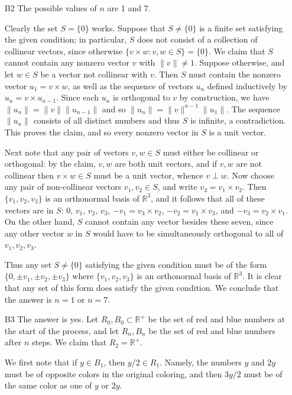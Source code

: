 \documentclass[amssymb,twocolumn,pra,10pt,aps]{revtex4-1}
\begin{document}
\begin{itemize}
\item[B2]
The possible values of $n$ are 1 and 7.

Clearly the set $S = \{0\}$ works. Suppose that $S \neq \{0\}$ is a finite set satisfying the given condition; in particular, $S$ does not consist of a collection of collinear vectors, since otherwise $\{v \times w: v,w \in S\} = \{0\}$. We claim that $S$ cannot contain any nonzero vector $v$ with $\|v\| \neq 1$. Suppose otherwise, and let $w \in S$ be a vector not collinear with $v$. Then $S$ must contain the nonzero vector $u_1 = v\times w$, as well as the sequence of vectors $u_n$ defined inductively by $u_n = v \times u_{n-1}$. Since each $u_n$ is orthogonal to $v$ by construction, we have $\|u_n\| = \|v\| \|u_{n-1}\|$ and so $\|u_n\| = \|v\|^{n-1} \|u_1\|$. The sequence $\|u_n\|$ consists of all distinct numbers and thus $S$ is infinite, a contradiction. This proves the claim, and so every nonzero vector in $S$ is a unit vector.

Next note that any pair of vectors $v,w \in S$ must either be collinear or orthogonal: by the claim, $v,w$ are both unit vectors, and if $v,w$ are not collinear then $v\times w \in S$ must be a unit vector, whence $v\perp w$. Now choose any pair of non-collinear vectors $v_1,v_2 \in S$, and write $v_3 = v_1 \times v_2$. Then $\{v_1,v_2,v_3\}$ is an orthonormal basis of $\mathbb{R}^3$, and it follows that all of these vectors are in $S$: $0$, $v_1$, $v_2$, $v_3$, $-v_1 = v_3 \times v_2$, $-v_2 = v_1 \times v_3$, and $-v_3 = v_2 \times v_1$. On the other hand, $S$ cannot contain any vector besides these seven, since any other vector $w$ in $S$ would have to be simultaneously orthogonal to all of $v_1,v_2,v_3$.

Thus any set $S \neq \{0\}$ satisfying the given condition must be of the form $\{0,\pm v_1,\pm v_2,\pm v_3\}$ where $\{v_1,v_2,v_3\}$ is an orthonormal basis of $\mathbb{R}^3$. It is clear that any set of this form does satisfy the given condition. We conclude that the answer is $n=1$ or $n=7$.

\item[B3]
The answer is yes. Let $R_0,B_0 \subset \mathbb{R}^+$ be the set of red and blue numbers at the start of the process, and let $R_n,B_n$ be the set of red and blue numbers after $n$ steps. We claim that $R_2 = \mathbb{R}^+$.

We first note that if $y \in B_1$, then $y/2 \in R_1$. Namely, the numbers $y$ and $2y$ must be of opposite colors in the original coloring, and then $3y/2$ must be of the same color as one of $y$ or $2y$. 


\end{itemize}
\end{document}
